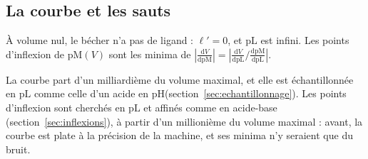 \documentclass[a4paper,11pt]{article}
\newcommand\pH{\ensuremath{\mathrm{pH}}\xspace}
\newcommand\pL{\ensuremath{\mathrm{pL}}\xspace}
\newcommand\pM{\ensuremath{\mathrm{pM}}\xspace}
\newcommand\ddp[2]{\frac{\mathrm{d}#1}{\mathrm{d}#2}}
\begin{document}
\subsection{La courbe et les sauts}
À volume nul, le bécher n'a pas de ligand : $\ell'=0$, et \pL est infini.
Les points d'inflexion de $\pM(V)$ sont les minima de $\left|\ddp V\pM\right|=\left|\ddp V\pL\big/\ddp\pM\pL\right|$.
\begin{algo}
La courbe part d'un milliardième du volume maximal, et elle est échantillonnée en \pL comme celle d'un acide en \pH (section~\ref{sec:echantillonnage}).
Les points d'inflexion sont cherchés en \pL et affinés comme en acide-base (section~\ref{sec:inflexions}), à partir d'un millionième du volume maximal : avant, la courbe est plate à la précision de la machine, et ses minima n'y seraient que du bruit.
\end{algo}
\end{document}
